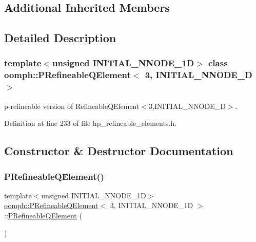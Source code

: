 \subsection*{Additional Inherited Members}


\subsection{Detailed Description}
\subsubsection*{template$<$unsigned I\+N\+I\+T\+I\+A\+L\+\_\+\+N\+N\+O\+D\+E\+\_\+1D$>$\newline
class oomph\+::\+P\+Refineable\+Q\+Element$<$ 3, I\+N\+I\+T\+I\+A\+L\+\_\+\+N\+N\+O\+D\+E\+\_\+D $>$}

p-\/refineable version of Refineable\+Q\+Element$<$3,\+I\+N\+I\+T\+I\+A\+L\+\_\+\+N\+N\+O\+D\+E\+\_\+D$>$. 

Definition at line 233 of file hp\+\_\+refineable\+\_\+elements.\+h.



\subsection{Constructor \& Destructor Documentation}
\mbox{\label{classoomph_1_1PRefineableQElement_3_013_00_01INITIAL__NNODE__1D_01_4_aec922a6b6f90129502e818f0a816f9d4}} 
\subsubsection{\texorpdfstring{P\+Refineable\+Q\+Element()}{PRefineableQElement()}}
{\footnotesize\ttfamily template$<$unsigned I\+N\+I\+T\+I\+A\+L\+\_\+\+N\+N\+O\+D\+E\+\_\+1D$>$ \\
\hyperlink{classoomph_1_1PRefineableQElement}{oomph\+::\+P\+Refineable\+Q\+Element}$<$ 3, I\+N\+I\+T\+I\+A\+L\+\_\+\+N\+N\+O\+D\+E\+\_\+1D $>$\+::\hyperlink{classoomph_1_1PRefineableQElement}{P\+Refineable\+Q\+Element} (\begin{DoxyParamCaption}{ }\end{DoxyParamCaption})\hspace{0.3cm}{\ttfamily [inline]}}




